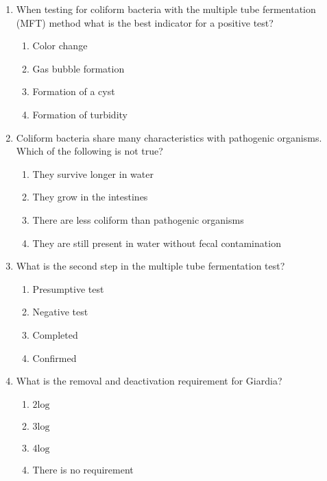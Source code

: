 \begin{enumerate}[1.]
\item  When testing for coliform bacteria with the multiple tube fermentation (MFT) method what is the best indicator for a positive test?\\
\begin{enumerate}
\item Color change\\
\item Gas bubble formation\\
\item Formation of a cyst\\
\item Formation of turbidity
\end{enumerate}

\item  Coliform bacteria share many characteristics with pathogenic organisms. Which of the following is not true?\\
\begin{enumerate}
\item They survive longer in water\\
\item They grow in the intestines\\
\item There are less coliform than pathogenic organisms\\
\item They are still present in water without fecal contamination
\end{enumerate}

\item  What is the second step in the multiple tube fermentation test?\\
\begin{enumerate}
\item Presumptive test\\
\item Negative test\\
\item Completed\\
\item Confirmed
\end{enumerate}

\item What is the removal and deactivation requirement for Giardia?\\
\begin{enumerate}
\item $2 \mathrm{log}$\\
\item $3 \mathrm{log}$\\
\item $4 \mathrm{log}$\\
\item There is no requirement
\end{enumerate}


\end{enumerate}
